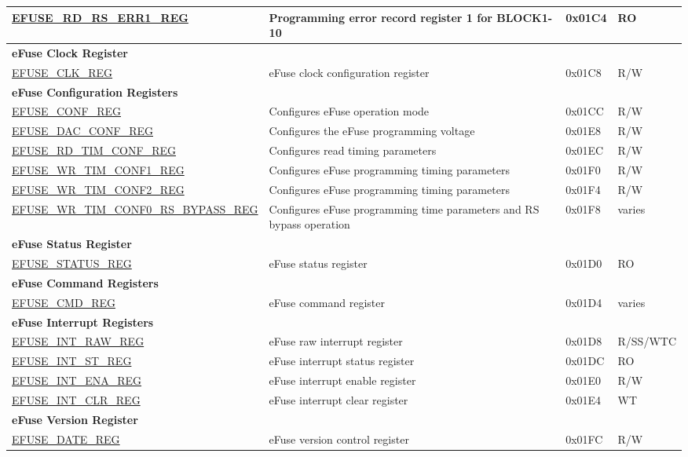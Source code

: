 \begin{longtable}{ | p{7cm} | p{7.2cm} | p{1.3cm} | p{1cm} | }
\hyperref[regdesc:EFUSERDRSERR1REG]{EFUSE\_RD\_RS\_ERR1\_REG} & Programming error record register 1 for BLOCK1-10 & 0x01C4 & RO \\ \hline
\multicolumn{4}{|l|}{\textbf{eFuse Clock Register}} \\ \hline
\hyperref[regdesc:EFUSECLKREG]{EFUSE\_CLK\_REG} & eFuse clock configuration register & 0x01C8 & R/W \\ \hline
\multicolumn{4}{|l|}{\textbf{eFuse Configuration Registers}} \\ \hline
\hyperref[regdesc:EFUSECONFREG]{EFUSE\_CONF\_REG} & Configures eFuse operation mode & 0x01CC & R/W \\ \hline
\hyperref[regdesc:EFUSEDACCONFREG]{EFUSE\_DAC\_CONF\_REG} & Configures the eFuse programming voltage & 0x01E8 & R/W \\ \hline
\hyperref[regdesc:EFUSERDTIMCONFREG]{EFUSE\_RD\_TIM\_CONF\_REG} & Configures read timing parameters & 0x01EC & R/W \\ \hline
\hyperref[regdesc:EFUSEWRTIMCONF1REG]{EFUSE\_WR\_TIM\_CONF1\_REG} & Configures eFuse programming timing parameters & 0x01F0 & R/W \\ \hline
\hyperref[regdesc:EFUSEWRTIMCONF2REG]{EFUSE\_WR\_TIM\_CONF2\_REG} & Configures eFuse programming timing parameters & 0x01F4 & R/W \\ \hline
\hyperref[regdesc:EFUSEWRTIMCONF0RSBYPASSREG]{EFUSE\_WR\_TIM\_CONF0\_RS\_BYPASS\_REG} & Configures eFuse programming time parameters and RS bypass operation & 0x01F8 & varies \\ \hline
\multicolumn{4}{|l|}{\textbf{eFuse Status Register}} \\ \hline
\hyperref[regdesc:EFUSESTATUSREG]{EFUSE\_STATUS\_REG} & eFuse status register & 0x01D0 & RO \\ \hline
\multicolumn{4}{|l|}{\textbf{eFuse Command Registers}} \\ \hline
\hyperref[regdesc:EFUSECMDREG]{EFUSE\_CMD\_REG} & eFuse command register & 0x01D4 & varies \\ \hline
\multicolumn{4}{|l|}{\textbf{eFuse Interrupt Registers}} \\ \hline
\hyperref[regdesc:EFUSEINTRAWREG]{EFUSE\_INT\_RAW\_REG} & eFuse raw interrupt register & 0x01D8 & R/SS/WTC \\ \hline
\hyperref[regdesc:EFUSEINTSTREG]{EFUSE\_INT\_ST\_REG} & eFuse interrupt status register & 0x01DC & RO \\ \hline
\hyperref[regdesc:EFUSEINTENAREG]{EFUSE\_INT\_ENA\_REG} & eFuse interrupt enable register & 0x01E0 & R/W \\ \hline
\hyperref[regdesc:EFUSEINTCLRREG]{EFUSE\_INT\_CLR\_REG} & eFuse interrupt clear register & 0x01E4 & WT \\ \hline
\multicolumn{4}{|l|}{\textbf{eFuse Version Register}} \\ \hline
\hyperref[regdesc:EFUSEDATEREG]{EFUSE\_DATE\_REG} & eFuse version control register & 0x01FC & R/W \\ \hline
\end{longtable}
